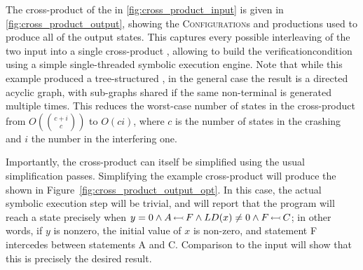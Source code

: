The cross-product of the {\StateMachines} in
\autoref{fig:cross_product_input} is given in
\autoref{fig:cross_product_output}, showing the
\textsc{Configuration}s and productions used to produce all of the
output states.  This captures every possible interleaving of the two
input {\StateMachines} into a single cross-product {\StateMachine},
allowing {\technique} to build the \gls{verificationcondition} using a
simple single-threaded symbolic execution engine.  Note that while
this example produced a tree-structured {\StateMachine}, in the
general case the result is a directed acyclic graph, with sub-graphs
shared if the same non-terminal is generated multiple times.  This
reduces the worst-case number of states in the cross-product
{\StateMachine} from $O(\binom{c+i}{c})$ to $O(ci)$, where $c$ is the
number of states in the crashing {\StateMachine} and $i$ the number in
the interfering one.

Importantly, the cross-product {\StateMachine} can itself be
simplified using the usual {\StateMachine} simplification passes.
Simplifying the example cross-product {\StateMachine} will produce the
{\StateMachine} shown in Figure~\ref{fig:cross_product_output_opt}.
In this case, the actual symbolic execution step will be trivial, and
will report that the program will reach a {\stCrash} state precisely
when $y = 0 \wedge A\,{\leftarrowtail}\,F \wedge LD(x) \not= 0 \wedge
F\,{\leftarrowtail}\,C$; in other words, if $y$ is nonzero, the initial
value of $x$ is non-zero, and statement F intercedes between
statements A and C.  Comparison to the input {\StateMachines} will
show that this is precisely the desired result.

